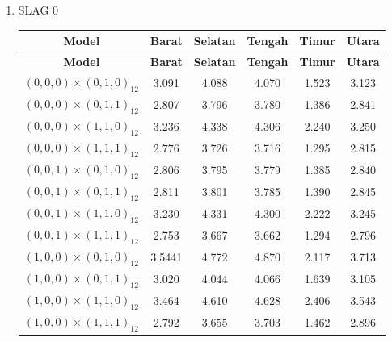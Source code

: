 \begin{enumerate}[label=\alph*.]
    \label{lampiran:rmse-inverse}
    \item SLAG 0
    \begin{longtable}{|c|c|c|c|c|c|}
        \hline
        \textbf{Model} & \textbf{Barat} & \textbf{Selatan} & \textbf{Tengah} & \textbf{Timur} & \textbf{Utara} \\
        \hline
        \endfirsthead

        \hline
        \textbf{Model} & \textbf{Barat} & \textbf{Selatan} & \textbf{Tengah} & \textbf{Timur} & \textbf{Utara} \\
        \hline
        \endhead

        \hline
        \endfoot
        \hline
        \endlastfoot

        {$(0,0,0) \times (0,1,0)_{12}$} & 3.091 & 4.088 & 4.070 & 1.523 & 3.123 \\ \hline
        {$(0,0,0) \times (0,1,1)_{12}$} & 2.807 & 3.796 & 3.780 & 1.386 & 2.841 \\ \hline
        {$(0,0,0) \times (1,1,0)_{12}$} & 3.236 & 4.338 & 4.306 & 2.240 & 3.250 \\ \hline
        {$(0,0,0) \times (1,1,1)_{12}$} & 2.776 & 3.726 & 3.716 & 1.295 & 2.815 \\ \hline

        {$(0,0,1) \times (0,1,0)_{12}$} & 2.806 & 3.795 & 3.779 & 1.385 & 2.840 \\ \hline
        {$(0,0,1) \times (0,1,1)_{12}$} & 2.811 & 3.801 & 3.785 & 1.390 & 2.845 \\ \hline
        {$(0,0,1) \times (1,1,0)_{12}$} & 3.230 & 4.331 & 4.300 & 2.222 & 3.245 \\ \hline
        {$(0,0,1) \times (1,1,1)_{12}$} & 2.753 & 3.667 & 3.662 & 1.294 & 2.796 \\ \hline

        {$(1,0,0) \times (0,1,0)_{12}$} & 3.5441 & 4.772 & 4.870 & 2.117 & 3.713 \\ \hline
        {$(1,0,0) \times (0,1,1)_{12}$} & 3.020 & 4.044 & 4.066 & 1.639 & 3.105 \\ \hline
        {$(1,0,0) \times (1,1,0)_{12}$} & 3.464 & 4.610 & 4.628 & 2.406 & 3.543 \\ \hline
        {$(1,0,0) \times (1,1,1)_{12}$} & 2.792 & 3.655 & 3.703 & 1.462 & 2.896 \\ \hline


\end{longtable}
\end{enumerate}
